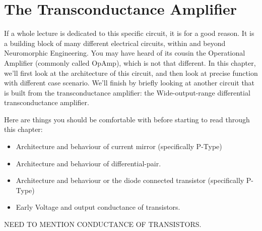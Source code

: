 \newpage
\section{The Transconductance Amplifier}

If a whole lecture is dedicated to this specific circuit, it is for a good reason. It is a building block of many different electrical circuits, within and beyond Neuromorphic Engineering. You may have heard of its cousin the Operational Amplifier (commonly called OpAmp), which is not that different. In this chapter, we'll first look at the architecture of this circuit, and then look at precise function with different case scenario. We'll finish by briefly looking at another circuit that is built from the transconductance amplifier: the Wide-output-range differential transconductance amplifier. 

Here are things you should be comfortable with before starting to read through this chapter: 
\begin{itemize}
    \item Architecture and behaviour of current mirror (specifically P-Type)
    \item Architecture and behaviour of differential-pair. 
    \item Architecture and behaviour or the diode connected transistor (specifically P-Type)
    \item Early Voltage and output conductance of transistors. 
\end{itemize}

NEED TO MENTION CONDUCTANCE OF TRANSISTORS.





